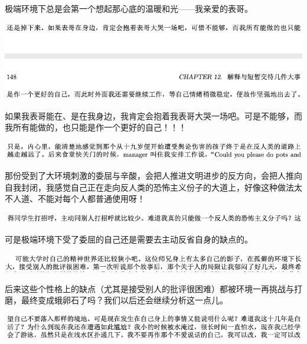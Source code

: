 \documentclass[9pt, b5paper]{article}
\begin{document}
极端环境下总是会第一个想起那心底的温暖和光——我亲爱的表哥。

\begin{center}
\includegraphics[width=.9\linewidth]{./pic/backups_plans_20210503_222023.png}
\end{center}

如果我表哥能在、是在我身边，我肯定会抱着我表哥大哭一场吧。可是不能够，而我所有能做的，也只能是作一个更好的自己！！！

\begin{center}
\includegraphics[width=.9\linewidth]{./pic/backups_plans_20210503_222148.png}
\end{center}

那份受到了大环境刺激的委屈与辛酸，会把人推进文明进步的反方向，会把人推向自我封闭，我感觉自己正在走向反人类的恐怖主义份子的大道上，好像这种做法太不人道、不能对每个人都普通使用呀！

\begin{center}
\includegraphics[width=.9\linewidth]{./pic/backups_plans_20210503_222258.png}
\end{center}

可是极端环境下受了委屈的自己还是需要去主动反省自身的缺点的。 

\begin{center}
\includegraphics[width=.9\linewidth]{./pic/backups_plans_20210503_222332.png}
\end{center}

后来这些个性格上的缺点（尤其是接受别人的批评很困难）都被环境一再挑战与打磨，最终变成蛾卵石了吗？我们以后还会继续分析这一点儿。 

\begin{center}
\includegraphics[width=.9\linewidth]{./pic/backups_plans_20210503_222647.png}
\end{center}
\end{document}
